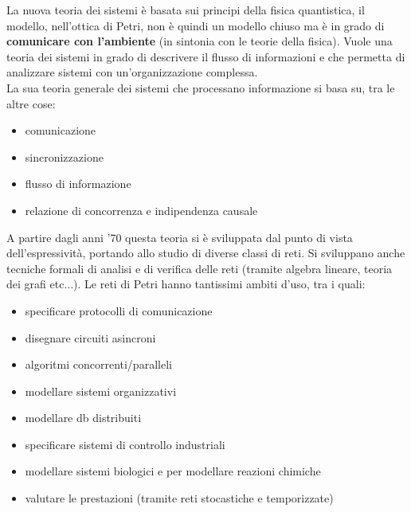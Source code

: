 \documentclass[a4paper,12pt, oneside]{book}
\begin{document}
La nuova teoria dei sistemi è basata sui principi della fisica quantistica, il
modello, nell’ottica di Petri, non è quindi un modello chiuso ma è 
in grado di \textbf{comunicare con l’ambiente} (in sintonia con le teorie della
fisica). Vuole una teoria dei sistemi in grado di descrivere il flusso di
informazioni e che permetta di analizzare sistemi con un'organizzazione
complessa.\\
La sua teoria generale dei sistemi che processano informazione si basa su, tra
le altre cose:
\begin{itemize}
  \item comunicazione
  \item sincronizzazione
  \item flusso di informazione
  \item relazione di concorrenza e indipendenza causale
\end{itemize}
A partire dagli anni '70 questa teoria si è sviluppata dal punto di vista
dell'espressività, portando allo studio di diverse classi di reti. Si sviluppano
anche tecniche formali di analisi e di verifica delle reti (tramite algebra
lineare, teoria dei grafi etc$\ldots$). Le reti di Petri hanno tantissimi ambiti
d'uso, tra i quali:
\begin{itemize}
  \item specificare protocolli di comunicazione
  \item disegnare circuiti asincroni
  \item algoritmi concorrenti/paralleli
  \item modellare sistemi organizzativi
  \item modellare db distribuiti
  \item specificare sistemi di controllo industriali
  \item modellare sistemi biologici e per modellare reazioni chimiche
  \item valutare le prestazioni (tramite reti stocastiche e temporizzate)
\end{itemize}
\end{document}
